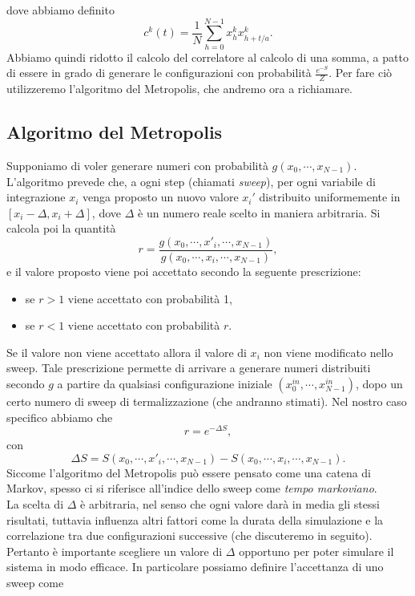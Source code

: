 \documentclass{article}
\begin{document}
dove abbiamo definito 
\begin{equation}
    \label{vasca da bagno}
    c^k(t)=\frac{1}{N}\sum_{h=0}^{N-1} x_{h}^kx_{h+t/a}^k.
\end{equation}
Abbiamo quindi ridotto il calcolo del correlatore al calcolo di una somma, a patto di essere in grado di generare le configurazioni con probabilità $\frac{e^{-S}}{Z}$.
Per fare ciò utilizzeremo l'algoritmo del Metropolis, che andremo ora a richiamare. 







\subsection{Algoritmo del Metropolis}
Supponiamo di voler generare numeri con probabilità $g(x_0,\cdots, x_{N-1})$.
L'algoritmo prevede che, a ogni step (chiamati \textit{sweep}), per ogni variabile di integrazione $x_i$ venga proposto un nuovo valore $x_i'$ distribuito uniformemente in $[x_i-\Delta, x_i+\Delta]$, dove $\Delta$ è un numero reale scelto in maniera arbitraria. Si calcola poi la quantità 
\begin{equation}
    r=\frac{g(x_0, \cdots, x'_i, \cdots, x_{N-1})}{g(x_0, \cdots, x_i, \cdots, x_{N-1})},
\end{equation}
e il valore proposto viene poi accettato secondo la seguente prescrizione:
\begin{itemize}
    \item se $r>1$ viene accettato con probabilità 1,
    \item se $r<1$ viene accettato con probabilità $r$.
\end{itemize}
Se il valore non viene accettato allora il valore di $x_i$ non viene modificato nello sweep. Tale prescrizione permette di arrivare a generare numeri distribuiti secondo $g$ a partire da qualsiasi configurazione iniziale $(x_0^{in},\cdots,x_{N-1}^{in})$, dopo un certo numero di sweep di termalizzazione (che andranno stimati).
Nel nostro caso specifico abbiamo che 
\begin{equation}
    \label{r metropolis}
    r=e^{-\Delta S},
\end{equation}
con 
\begin{equation}
    \Delta S=S(x_0, \cdots, x'_i, \cdots, x_{N-1})-S(x_0, \cdots, x_i, \cdots, x_{N-1}).
\end{equation}
Siccome l'algoritmo del Metropolis può essere pensato come una catena di Markov, spesso ci si riferisce all'indice dello sweep come \textit{tempo markoviano}. \\ La scelta di $\Delta$ è arbitraria, nel senso che ogni valore darà in media gli stessi risultati, tuttavia influenza altri fattori come la durata della simulazione e la correlazione tra due configurazioni successive (che discuteremo in seguito). Pertanto è importante scegliere un valore di $\Delta$ opportuno per poter simulare il sistema in modo efficace. In particolare possiamo definire l'accettanza di uno sweep come 
\end{document}

